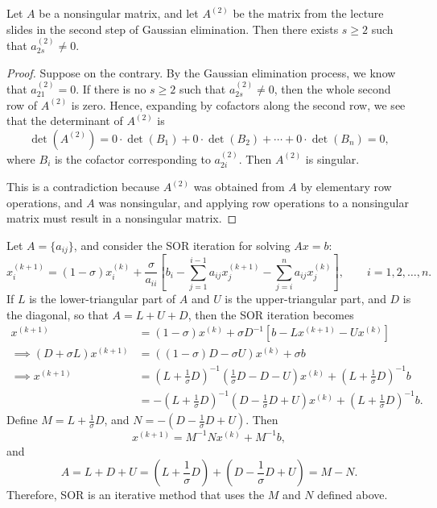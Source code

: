 \documentclass{homework}
\begin{document}
	\maketitle
	
	\question
	\newcommand{\atwo}{A^{(2)}}
	Let $A$ be a nonsingular matrix, and let $\atwo$ be the matrix from the lecture slides in the second step of Gaussian elimination. Then there exists $s \ge 2$ such that $a_{2s}^{(2)} \ne 0$.
	\begin{proof}
		Suppose on the contrary. By the Gaussian elimination process, we know that $a_{21}^{(2)} = 0$. If there is no $s \ge 2$ such that $a_{2s}^{(2)} \ne 0$, then the whole second row of $\atwo$ is zero. Hence, expanding by cofactors along the second row, we see that the determinant of $\atwo$ is
		\begin{equation}
			\det\left(\atwo\right) = 0\cdot\det(B_1) + 0\cdot\det(B_2) + \cdots +0\cdot\det(B_n) = 0,
		\end{equation}
		where $B_i$ is the cofactor corresponding to $a^{(2)}_{2i}$. Then $\atwo$ is singular.
		
		This is a contradiction because $\atwo$ was obtained from $A$ by elementary row operations, and $A$ was nonsingular, and applying row operations to a nonsingular matrix must result in a nonsingular matrix.
	\end{proof}
	
	\question
	Let $A = \{a_{ij}\}$, and consider the SOR iteration for solving $Ax = b$:
	\begin{equation}
		x^{(k+1)}_i = (1-\sigma)x^{(k)}_i + \frac{\sigma}{a_{ii}}\left[b_i - \sum_{j=1}^{i-1}a_{ij}x^{(k+1)}_j - \sum_{j=i}^na_{ij}x^{(k)}_j\right], \qquad i=1,2,\dots,n.
	\end{equation}
	If $L$ is the lower-triangular part of $A$ and $U$ is the upper-triangular part, and $D$ is the diagonal, so that $A = L + U +D$, then the SOR iteration becomes
	\begin{align}
		x^{(k+1)} &= (1-\sigma)x^{(k)} + \sigma D^{-1}\left[b -Lx^{(k+1)} - Ux^{(k)}\right] \\
		\implies (D + \sigma L)x^{(k+1)} &= ((1-\sigma)D-\sigma U)x^{(k)} + \sigma b \\
		\implies x^{(k+1)} &= \left(L + \frac{1}{\sigma}D\right)^{-1}\left(\frac{1}{\sigma}D - D - U\right)x^{(k)} + \left(L + \frac{1}{\sigma}D\right)^{-1}b \\
		&= -\left(L+\frac{1}{\sigma}D\right)^{-1}\left(D - \frac{1}{\sigma}D +U\right)x^{(k)} +\left(L+\frac{1}{\sigma}D\right)^{-1}b.
	\end{align}
	Define $M = L + \frac{1}{\sigma}D$, and $N = -\left(D-\frac{1}{\sigma}D+U\right)$. Then
	\begin{equation}
		x^{(k+1)} = M^{-1}Nx^{(k)} + M^{-1}b,
	\end{equation}
	and
	\begin{equation}
		A = L + D + U = \left(L+\frac{1}{\sigma}D\right) + \left(D - \frac{1}{\sigma}D + U\right) = M - N.
	\end{equation}
	Therefore, SOR is an iterative method that uses the $M$ and $N$ defined above.
	
	\question
	
\end{document}

